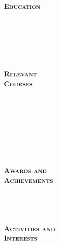 \documentclass[10pt]{article}
\begin{document}
\begin{minipage}[t]{0.16\linewidth} 
	\textbf{\textsc{
	\hspace{-5pt}Education \\ \\ \\ \\ \\ \\ \\ 
	Relevant \\ Courses \\ \\ \\ \\ \\ \\ \\ \\ \\ 
	Awards and \\ Achievements \\ \\ \\ \\ \\
	Activities and\\ Interests
	}}
\end{minipage}
\end{document}
